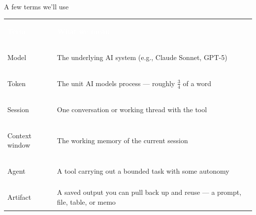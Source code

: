 \documentclass[aspectratio=169, 10pt]{beamer}
\begin{document}
\begin{frame}{A few terms we'll use}
\vskip4pt
\begin{center}
{\small
\renewcommand{\arraystretch}{1.35}
\begin{tabular}{>{\bfseries\raggedright\arraybackslash}m{3.0cm} >{\raggedright\arraybackslash}m{9.6cm}}
\rowcolor{SlateTeal}
\textcolor{white}{\textbf{Term}} & \textcolor{white}{\textbf{What we mean}} \\
\rowcolor{PaleSage}
Model & The underlying AI system (e.g., Claude Sonnet, GPT-5) \\
\rowcolor{white}
Token & The unit AI models process --- roughly $\frac{3}{4}$ of a word \\
\rowcolor{PaleSage}
Session & One conversation or working thread with the tool \\
\rowcolor{white}
Context window & The working memory of the current session  \\
\rowcolor{PaleSage}
Agent & A tool carrying out a bounded task with some autonomy \\
\rowcolor{white}
Artifact & A saved output you can pull back up and reuse --- a prompt, file, table, or memo \\
\end{tabular}
}
\end{center}
\end{frame}
\end{document}
